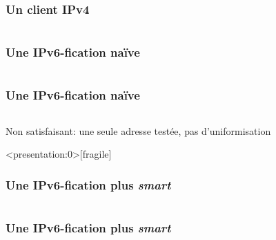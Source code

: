 \begin{frame}[fragile]{}
	\frametitle{Un client IPv4}
    \begin{minipage}{0.5\textwidth}
      \inputminted[mathescape,
        linenos,
        fontsize=\scriptsize,
        framesep=2mm]{python}{../echo_client_v4.py}
    \end{minipage}
	
\end{frame}

\begin{frame}[fragile]{}
	\frametitle{Une IPv6-fication naïve}
    \begin{minipage}{0.5\textwidth}
      \inputminted[mathescape,
        fontsize=\scriptsize,
        framesep=2mm]{diff}{../echo_client_v4_v6.diff}
    \end{minipage}
\end{frame}


\begin{frame}[fragile]{}
	\frametitle{Une IPv6-fication naïve}
    \begin{minipage}{\textwidth}
      \inputminted[mathescape,
        linenos,
        fontsize=\scriptsize,
        framesep=2mm]{python}{../echo_client_v6_naif.py}
		Non satisfaisant: une seule adresse testée, pas d'uniformisation
    \end{minipage}
\end{frame}

\begin{frame}<presentation:0>[fragile]{}
	\frametitle{Une IPv6-fication plus \emph{smart}}
    \begin{minipage}{0.5\textwidth}
      \inputminted[mathescape,
        fontsize=\scriptsize,
        framesep=2mm]{diff}{../echo_client_v6_naif_v6.diff}
    \end{minipage}
\end{frame}


\begin{frame}[fragile]{}
	\frametitle{Une IPv6-fication plus \emph{smart}}
    \begin{minipage}{0.5\textwidth}
      \inputminted[mathescape,
        linenos,
        fontsize=\scriptsize,
        framesep=2mm]{python}{../echo_client_v6.py}
    \end{minipage}
\end{frame}



